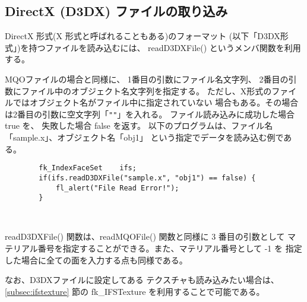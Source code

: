 \subsection{DirectX (D3DX) ファイルの取り込み} \label{subsec:d3dxread}
DirectX 形式(X 形式と呼ばれることもある)のフォーマット
(以下「D3DX形式」)を持つファイルを読み込むには、
readD3DXFile() というメンバ関数を利用する。

MQOファイルの場合と同様に、
1番目の引数にファイル名文字列、
2番目の引数にファイル中のオブジェクト名文字列を指定する。
ただし、X形式のファイルではオブジェクト名がファイル中に指定されていない
場合もある。その場合は2番目の引数に空文字列「\verb+""+」を入れる。
ファイル読み込みに成功した場合 true を、
失敗した場合 false を返す。
以下のプログラムは、ファイル名「sample.x」、オブジェクト名「obj1」
という指定でデータを読み込む例である。
\\
\begin{screen}
\begin{verbatim}
        fk_IndexFaceSet    ifs;
        if(ifs.readD3DXFile("sample.x", "obj1") == false) {
            fl_alert("File Read Error!");
        }
\end{verbatim}
\end{screen} ~

readD3DXFile() 関数は、readMQOFile() 関数と同様に 3 番目の引数として
マテリアル番号を指定することができる。また、マテリアル番号として -1 を
指定した場合に全ての面を入力する点も同様である。

なお、D3DXファイルに設定してある
テクスチャも読み込みたい場合は、\ref{subsec:ifstexture} 節の
fk\_IFSTexture を利用することで可能である。

